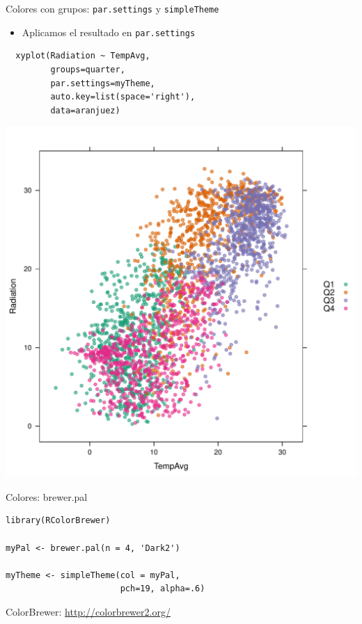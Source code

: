 \documentclass[xcolor={usenames,svgnames,dvipsnames}]{beamer}
\begin{document}
\begin{frame}[fragile,label=sec-2-1-23]{Colores con grupos: \texttt{par.settings} y \texttt{simpleTheme}}
 \begin{itemize}
\item Aplicamos el resultado en \texttt{par.settings}
\end{itemize}
\lstset{language=R,label= ,caption= ,numbers=none}
\begin{lstlisting}
  xyplot(Radiation ~ TempAvg,
         groups=quarter,
         par.settings=myTheme,
         auto.key=list(space='right'),
         data=aranjuez)
\end{lstlisting}
\end{frame}

\begin{frame}[label=sec-2-1-24]{}
\includegraphics[width=.9\linewidth]{figs/myTheme.pdf}
\end{frame}

\begin{frame}[fragile,label=sec-2-1-25]{Colores: brewer.pal}
 \lstset{language=R,label= ,caption= ,numbers=none}
\begin{lstlisting}
library(RColorBrewer)

myPal <- brewer.pal(n = 4, 'Dark2')

myTheme <- simpleTheme(col = myPal,
                       pch=19, alpha=.6)
\end{lstlisting}

\begin{block}{ColorBrewer: \url{http://colorbrewer2.org/}}
\end{block}
\end{frame}
\end{document}
